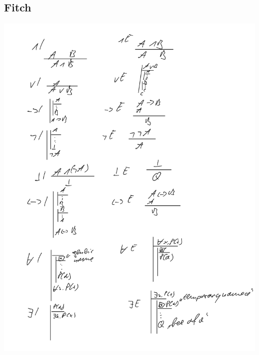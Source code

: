 \documentclass{article}
\begin{document}
		\subsection{Fitch}
			\includegraphics[scale=0.3]{IMG_0800.PNG}
\end{document}
